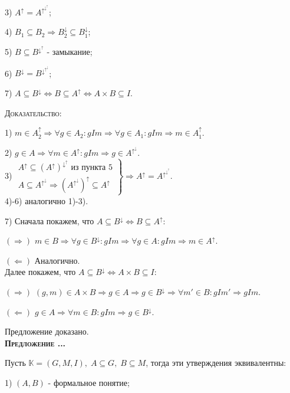 \documentclass[18pt, a4paper]{extarticle}
\newcounter{par}
\newcounter{spar}
\newcounter{zap}
\newcommand{\predl}{\textbf{\textsc{Предложение \thepar.\if\thespar1\thespar.\fi\thezap.\;}}\stepcounter{zap}}
\newcommand{\dok}{\textsc{Доказательство:}}
\newcommand{\rightdok}{\boxed{(\Rightarrow)}}
\newcommand{\leftdok}{\boxed{(\Leftarrow)}}
\newcommand{\galoisup}{^\uparrow}
\newcommand{\galoisdown}{^\downarrow}
\begin{document}
3) $A\galoisup=A\galoisup\galoisdown\galoisup$;

4) $B_1\subseteq B_2\Rightarrow B_2\galoisdown\subseteq B_1\galoisdown$;

5) $B\subseteq B\galoisdown\galoisup$ - замыкание;

6) $B\galoisdown=B\galoisdown\galoisup\galoisdown$;

7) $A\subseteq B\galoisdown\Leftrightarrow B\subseteq A\galoisup\Leftrightarrow A\times B\subseteq I$.

\dok

1) $m\in A_2\galoisup\Rightarrow\forall g\in A_2:gIm\Rightarrow\forall g\in A_1:gIm\Rightarrow m\in A_1\galoisup$.

2) $g\in A\Rightarrow\forall m\in A\galoisup:gIm\Rightarrow g\in A\galoisup\galoisdown$.\\

3) $\left.
  \begin{array}{c}
    A\galoisup\subseteq (A\galoisup)\galoisdown\galoisup\text{ из пункта 5} \\
    A\subseteq A\galoisup\galoisdown\Rightarrow (A\galoisup\galoisdown)\galoisup\subseteq A\galoisup
  \end{array}
  \right\}\Rightarrow A\galoisup=A\galoisup\galoisdown\galoisup$.\\

4)-6) аналогично 1)-3).

7) Сначала покажем, что $A\subseteq B\galoisdown\Leftrightarrow B\subseteq A\galoisup$:

$\rightdok$ $m\in B\Rightarrow\forall g\in B\galoisdown:gIm\Rightarrow\forall g\in A:gIm\Rightarrow m\in A\galoisup$.

$\leftdok$ Аналогично.\\

Далее покажем, что $A\subseteq B\galoisdown\Leftrightarrow A\times B\subseteq I$:

$\rightdok$ $(g,m)\in A\times B\Rightarrow g\in A\Rightarrow g\in B\galoisdown\Rightarrow\forall m'\in B:gIm'\Rightarrow gIm$.

$\leftdok$ $g\in A\Rightarrow\forall m\in B: gIm\Rightarrow g\in B\galoisdown$.

Предложение доказано.\\

\predl

Пусть $\mathbb{K}=(G,M,I),\;A\subseteq G,\;B\subseteq M$, тогда эти утверждения эквивалентны:

1) $(A,B)$ - формальное понятие;
\end{document}
